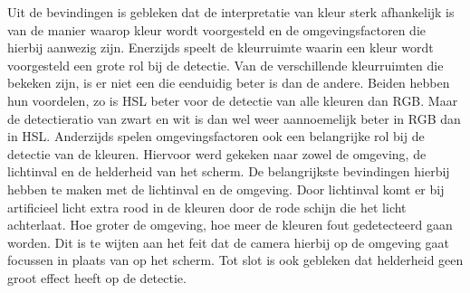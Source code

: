  

Uit de bevindingen is gebleken dat de interpretatie van kleur sterk afhankelijk is van de manier waarop kleur wordt voorgesteld en de omgevingsfactoren die hierbij aanwezig zijn. Enerzijds speelt de kleurruimte waarin een kleur wordt voorgesteld een grote rol bij de detectie. Van de verschillende kleurruimten die bekeken zijn, is er niet een die eenduidig beter is dan de andere. Beiden hebben hun voordelen, zo is HSL beter voor de detectie van alle kleuren dan RGB. Maar de detectieratio van zwart en wit is dan wel weer aannoemelijk beter in RGB dan in HSL.  Anderzijds spelen omgevingsfactoren ook een belangrijke rol bij de detectie van de kleuren. Hiervoor werd gekeken naar zowel de omgeving, de lichtinval en de helderheid van het scherm. De belangrijkste bevindingen hierbij hebben te maken met de lichtinval en de omgeving. Door lichtinval komt er bij artificieel licht extra rood in de kleuren door de rode schijn die het licht achterlaat. Hoe groter de omgeving, hoe meer de kleuren fout gedetecteerd gaan worden. Dit is te wijten aan het feit dat de camera hierbij op de omgeving gaat focussen in plaats van op het scherm. Tot slot is ook gebleken dat helderheid geen groot effect heeft op de detectie.